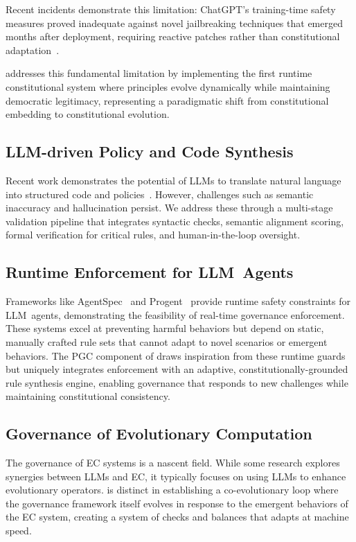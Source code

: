 Recent incidents demonstrate this limitation: ChatGPT's training-time safety measures proved inadequate against novel jailbreaking techniques that emerged months after deployment, requiring reactive patches rather than constitutional adaptation~\cite{wei2023jailbroken}.

\acgs{} addresses this fundamental limitation by implementing the first runtime constitutional system where principles evolve dynamically while maintaining democratic legitimacy, representing a paradigmatic shift from constitutional embedding to constitutional evolution.

\subsection{LLM-driven Policy and Code Synthesis}
Recent work demonstrates the potential of LLMs to translate natural language into structured code and policies~\cite{propertygpt2023, veriplan2023}. However, challenges such as semantic inaccuracy and hallucination persist. We address these through a multi-stage validation pipeline that integrates syntactic checks, semantic alignment scoring, formal verification for critical rules, and human-in-the-loop oversight.

\subsection{Runtime Enforcement for LLM~Agents}
Frameworks like AgentSpec~\cite{agentspec2023} and Progent~\cite{progent2023} provide runtime safety constraints for LLM~agents, demonstrating the feasibility of real-time governance enforcement. These systems excel at preventing harmful behaviors but depend on static, manually crafted rule sets that cannot adapt to novel scenarios or emergent behaviors. The PGC component of \acgs{} draws inspiration from these runtime guards but uniquely integrates enforcement with an adaptive, constitutionally-grounded rule synthesis engine, enabling governance that responds to new challenges while maintaining constitutional consistency.

\subsection{Governance of Evolutionary Computation}
The governance of EC systems is a nascent field. While some research explores synergies between LLMs and EC, it typically focuses on using LLMs to enhance evolutionary operators. \acgs{} is distinct in establishing a co-evolutionary loop where the governance framework itself evolves in response to the emergent behaviors of the EC system, creating a system of checks and balances that adapts at machine speed.
